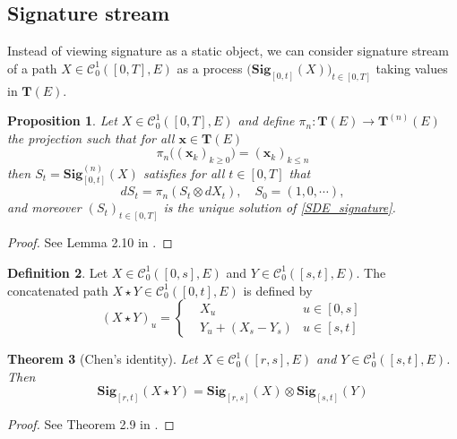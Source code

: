 \documentclass[12pt]{report}
\newtheorem{theorem}{Theorem}[chapter]
\newtheorem{proposition}[theorem]{Proposition}
\theoremstyle{definition}
\newtheorem{definition}[theorem]{Definition}
\theoremstyle{remark}
\begin{document}
\subsection{Signature stream}
Instead of viewing signature as a static object, we can consider signature stream of a path $X \in \mathcal{C}^{1}_{0}([0,T],E)$ as a process $\big(\mathbf{Sig}_{[0,t]}(X)\big)_{t \in [0,T]}$ taking values in $\mathbf{T}(E)$.
\begin{proposition}
  Let $X \in \mathcal{C}^{1}_{0}([0,T],E)$ and define $\pi_{n} \colon \mathbf{T}(E) \to \mathbf{T}^{(n)}(E)$ the projection such that for all $\mathbf{x} \in \mathbf{T}(E)$ 
  \begin{equation}\label{projection}
    \pi_{n}\big((\mathbf{x}_{k})_{k\geq 0}\big) = (\mathbf{x}_{k})_{k\leq n}
  \end{equation}
  then $S_{t} = \mathbf{Sig}^{(n)}_{[0,t]}(X)$ satisfies for all $t \in [0,T]$ that 
  \begin{equation}\label{SDE_signature}
    dS_{t} = \pi_{n}(S_{t}\otimes dX_{t}),\quad S_{0} = (1,0,\cdots),
  \end{equation} 
  and moreover $(S_{t})_{t \in [0,T]}$ is the unique solution of \eqref{SDE_signature}. 
\end{proposition}
\begin{proof}
  See Lemma 2.10 in \cite{lyons2007differential}.
\end{proof}


\begin{definition}
  Let $X \in \mathcal{C}^{1}_{0}([0,s],E)$ and  $Y \in \mathcal{C}^{1}_{0}([s,t],E)$. The concatenated path $X\star Y \in\mathcal{C}^{1}_{0}([0,t],E) $ is defined by 
  \begin{equation}
    (X\star Y)_{u} = \left\{\begin{aligned}
      &X_{u} &u\in [0,s]\\
      &Y_{u} + (X_{s} - Y_{s}) &u\in [s,t]
    \end{aligned}\right.
  \end{equation}
\end{definition}
\begin{theorem}[Chen's identity]
  Let $X \in \mathcal{C}^{1}_{0}([r,s],E)$ and  $Y \in \mathcal{C}^{1}_{0}([s,t],E)$. Then 
  \begin{equation}
    \mathbf{Sig}_{[r,t]}(X\star Y) = \mathbf{Sig}_{[r,s]}(X) \otimes \mathbf{Sig}_{[s,t]}(Y)
  \end{equation}
\end{theorem}
\begin{proof}
  See Theorem 2.9 in \cite{lyons2007differential}.
\end{proof}
\end{document}
